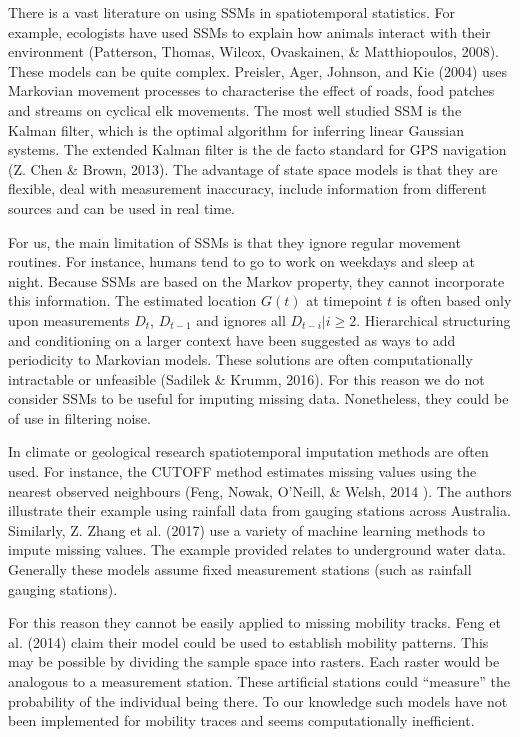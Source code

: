 \documentclass[english,man]{apa6}
\newcounter{author}
\theoremstyle{definition}
\theoremstyle{definition}
\theoremstyle{definition}
\theoremstyle{remark}
\begin{document}
There is a vast literature on using SSMs in spatiotemporal statistics.
For example, ecologists have used SSMs to explain how animals interact
with their environment (Patterson, Thomas, Wilcox, Ovaskainen, \&
Matthiopoulos, 2008). These models can be quite complex. Preisler, Ager,
Johnson, and Kie (2004) uses Markovian movement processes to
characterise the effect of roads, food patches and streams on cyclical
elk movements. The most well studied SSM is the Kalman filter, which is
the optimal algorithm for inferring linear Gaussian systems. The
extended Kalman filter is the de facto standard for GPS navigation (Z.
Chen \& Brown, 2013). The advantage of state space models is that they
are flexible, deal with measurement inaccuracy, include information from
different sources and can be used in real time.

For us, the main limitation of SSMs is that they ignore regular movement
routines. For instance, humans tend to go to work on weekdays and sleep
at night. Because SSMs are based on the Markov property, they cannot
incorporate this information. The estimated location \(G(t)\) at
timepoint \(t\) is often based only upon measurements \(D_t\),
\(D_{t-1}\) and ignores all \(D_{t-i}|i\geq2\). Hierarchical structuring
and conditioning on a larger context have been suggested as ways to add
periodicity to Markovian models. These solutions are often
computationally intractable or unfeasible (Sadilek \& Krumm, 2016). For
this reason we do not consider SSMs to be useful for imputing missing
data. Nonetheless, they could be of use in filtering noise.

In climate or geological research spatiotemporal imputation methods are
often used. For instance, the CUTOFF method estimates missing values
using the nearest observed neighbours (Feng, Nowak, O'Neill, \& Welsh,
2014 ). The authors illustrate their example using rainfall data from
gauging stations across Australia. Similarly, Z. Zhang et al. (2017) use
a variety of machine learning methods to impute missing values. The
example provided relates to underground water data. Generally these
models assume fixed measurement stations (such as rainfall gauging
stations).

For this reason they cannot be easily applied to missing mobility
tracks. Feng et al. (2014) claim their model could be used to establish
mobility patterns. This may be possible by dividing the sample space
into rasters. Each raster would be analogous to a measurement station.
These artificial stations could \enquote{measure} the probability of the
individual being there. To our knowledge such models have not been
implemented for mobility traces and seems computationally inefficient.
\end{document}
